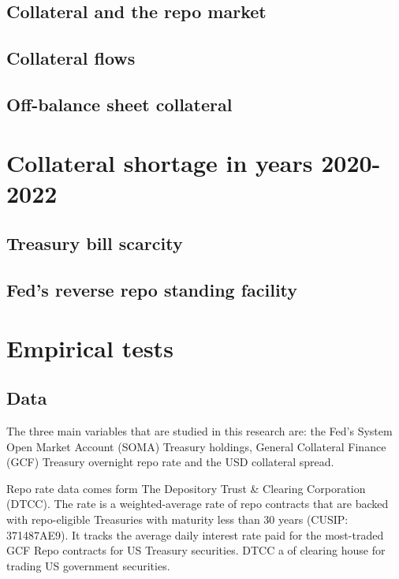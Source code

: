\documentclass[11pt,a4paper,english,oneside]{article}
\begin{document}
\subsection{Collateral and the repo market} %

\subsection{Collateral flows} %

\subsection{Off-balance sheet collateral} %

\newpage

\section{Collateral shortage in years 2020-2022} \label{sec:shortage}%

\subsection{Treasury bill scarcity} \label{sec:bills}

\subsection{Fed's reverse repo standing facility} \label{sec:rrp}

\newpage

\section{Empirical tests} \label{sec:empirical}

\subsection{Data} \label{sec:data}

The three main variables that are studied in this research are: the Fed's System Open Market Account (SOMA) Treasury holdings, General Collateral Finance (GCF) Treasury overnight repo rate and the USD collateral spread.

Repo rate data comes form The Depository Trust \& Clearing Corporation (DTCC). The rate is a weighted-average rate of repo contracts that are backed with repo-eligible Treasuries with maturity less than 30 years (CUSIP: 371487AE9). It tracks the average daily interest rate paid for the most-traded GCF Repo contracts for US Treasury securities. DTCC a of clearing house for trading US government securities.
\end{document}
